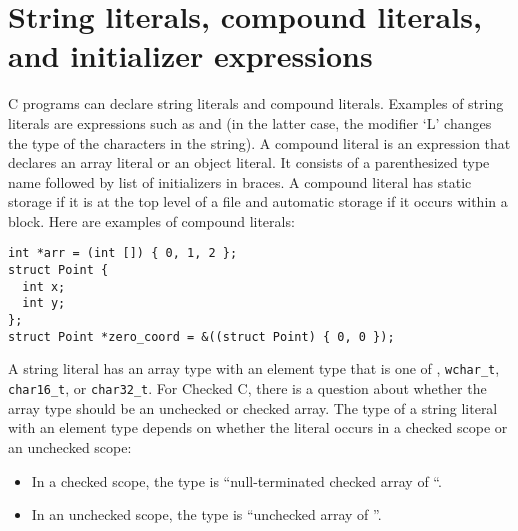 \section{String literals, compound literals, and initializer expressions}

C programs can declare string literals and compound literals.  Examples
of string literals are expressions such as  and 
(in the latter case, the modifier `L' changes the type of the characters in the string).
A compound literal is an expression that declares an array literal or an object literal.
It consists of a parenthesized type name followed by list of initializers in braces.
A compound literal has static storage if it is at the top level of a file and automatic
storage if it occurs within a block.  Here are examples of compound literals:
\begin{lstlisting}
int *arr = (int []) { 0, 1, 2 };
struct Point {
  int x;
  int y;
};
struct Point *zero_coord = &((struct Point) { 0, 0 });
\end{lstlisting}

A string literal has an array type with an element type that is one of ,
\lstinline+wchar_t+,  \lstinline+char16_t+, or \lstinline+char32_t+.   For Checked C, there is a question
about whether the array type should be an unchecked or checked array.
The type of a string literal with an element type  depends on whether the literal occurs
in a checked scope or an unchecked scope:
\begin{itemize}
\item In a checked scope, the type is ``null-terminated checked array of ``.
\item In an unchecked scope, the type is ``unchecked array of ''.
\end{itemize}

